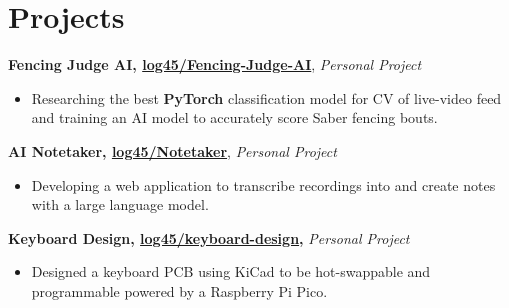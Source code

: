 \documentclass{article}
\newcommand{\mpar}[1]{\leavevmode\marginpar{\raggedleft #1}}
\begin{document}


\section{Projects}

\textbf{Fencing Judge AI, \href{https://github.com/log45/Fencing-Judge-AI}{log45/Fencing-Judge-AI}}, \emph{Personal Project}
\begin{itemize}
	\item Researching the best \textbf{PyTorch} classification model for CV of live-video feed and training an AI model to accurately score Saber fencing bouts.
\end{itemize}

\smallskip

\textbf{AI Notetaker,
\href{https://github.com/log45/Notetaker}{log45/Notetaker}}, \emph{Personal Project}
\begin{itemize}
	\item Developing a web application to transcribe recordings into  and create notes with a large language model. 
\end{itemize}

\smallskip
\textbf{Keyboard Design, \href{https://github.com/log45/keyboard-design}{log45/keyboard-design},} \emph{Personal Project}
\begin{itemize}
    \item Designed a keyboard PCB using KiCad to be hot-swappable and programmable powered by a Raspberry Pi Pico.
\end{itemize}

\end{document}

